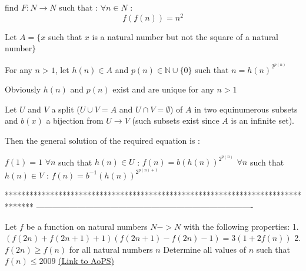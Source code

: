 \begin{solution}
	\begin{tcolorbox}find $ F: N \to N$ such that :
$ \forall n \in N$ :
\[ f(f(n)) = n^2\]
\end{tcolorbox}

Let $ A=\{x$ such that $ x$ is a natural number but not the square of a natural number$ \}$

For any $ n>1$, let $ h(n)\in A$ and $ p(n)\in\mathbb N\cup\{0\}$ such that $ n=h(n)^{2^{p(n)}}$

Obviously $ h(n)$ and $ p(n)$ exist and are unique for any $ n>1$

Let $ U$ and $ V$ a split ($ U\cup V=A$ and $ U\cap V=\emptyset$) of $ A$ in two equinumerous subsets and $ b(x)$ a bijection from $ U\to V$ (such subsets exist since $ A$ is an infinite set).


Then the general solution of the required equation is :

$ f(1)=1$
$ \forall n$ such that $ h(n)\in U$ : $ f(n)=b(h(n))^{2^{p(n)}}$
$ \forall n$ such that $ h(n)\in V$ : $ f(n)=b^{-1}(h(n))^{2^{p(n)+1}}$
\end{solution}
*******************************************************************************
-------------------------------------------------------------------------------

\begin{problem}
	Let $ f$ be a function on natural numbers $ N->N$ with the following properties:
1.$ (f(2n)+f(2n+1)+1)(f(2n+1)-f(2n)-1)=3(1+2f(n))$
2.$ f(2n)\ge f(n)$
for all natural numbers $ n$
Determine all values of $ n$ such that $ f(n)\le 2009$
	\flushright \href{https://artofproblemsolving.com/community/c6h289830}{(Link to AoPS)}
\end{problem}



